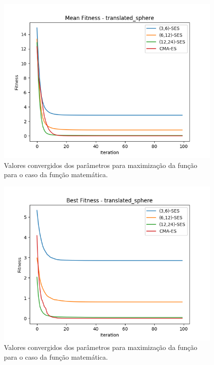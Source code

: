 \documentclass[conference]{IEEEtran}
\begin{document}
\begin{figure}[htbp]
\centering
\centerline{\includegraphics[scale=0.4]{imagens/translated_sphere/mean_fitness.png}}
\caption{Valores convergidos dos parâmetros para maximização da função para o caso da função matemática.}
\label{translated_sphere/mean_fitness}
\end{figure}

\begin{figure}[htbp]
\centering
\centerline{\includegraphics[scale=0.4]{imagens/translated_sphere/best_fitness.png}}
\caption{Valores convergidos dos parâmetros para maximização da função para o caso da função matemática.}
\label{translated_sphere/best_fitness}
\end{figure}
\end{document}
